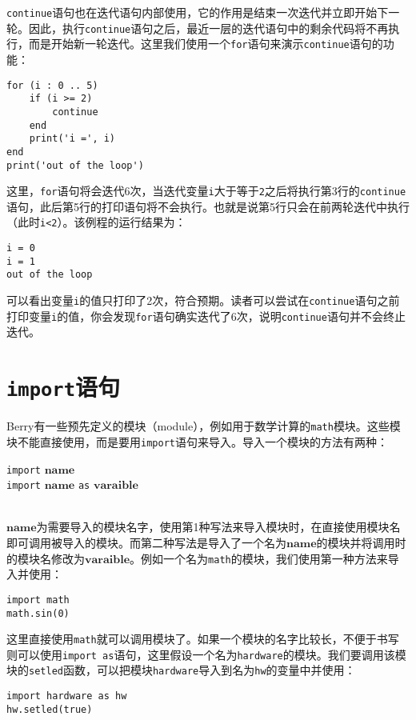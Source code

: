 \texttt{continue}语句也在迭代语句内部使用，它的作用是结束一次迭代并立即开始下一轮。因此，执行\texttt{continue}语句之后，最近一层的迭代语句中的剩余代码将不再执行，而是开始新一轮迭代。这里我们使用一个\texttt{for}语句来演示\texttt{continue}语句的功能：
\begin{lstlisting}[language=berry]
for (i : 0 .. 5)
    if (i >= 2)
        continue
    end
    print('i =', i)
end
print('out of the loop')
\end{lstlisting}
这里，\texttt{for}语句将会迭代6次，当迭代变量\texttt{i}大于等于\texttt{2}之后将执行第3行的\texttt{continue}语句，此后第5行的打印语句将不会执行。也就是说第5行只会在前两轮迭代中执行（此时\texttt{i<2}）。该例程的运行结果为：
\begin{lstlisting}[numbers=none]
i = 0
i = 1
out of the loop
\end{lstlisting}
可以看出变量\texttt{i}的值只打印了2次，符合预期。读者可以尝试在\texttt{continue}语句之前打印变量\texttt{i}的值，你会发现\texttt{for}语句确实迭代了6次，说明\texttt{continue}语句并不会终止迭代。

\section{\texttt{import}语句}

Berry有一些预先定义的模块（module），例如用于数学计算的\texttt{math}模块。这些模块不能直接使用，而是要用\texttt{import}语句来导入。导入一个模块的方法有两种：
\begin{algorithm}
    \texttt{import} $\bm{name}$ \\
    \texttt{import} $\bm{name}$ \texttt{as} $\bm{varaible}$
\end{algorithm}\vspace{-0.6em}\\
$\bm{name}$为需要导入的模块名字，使用第1种写法来导入模块时，在直接使用模块名即可调用被导入的模块。而第二种写法是导入了一个名为$\bm{name}$的模块并将调用时的模块名修改为$\bm{varaible}$。例如一个名为\texttt{math}的模块，我们使用第一种方法来导入并使用：
\begin{lstlisting}[language=berry, numbers=none]
import math
math.sin(0)
\end{lstlisting}
这里直接使用\texttt{math}就可以调用模块了。如果一个模块的名字比较长，不便于书写则可以使用\texttt{import as}语句，这里假设一个名为\texttt{hardware}的模块。我们要调用该模块的\texttt{setled}函数，可以把模块\texttt{hardware}导入到名为\texttt{hw}的变量中并使用：
\begin{lstlisting}[language=berry, numbers=none]
import hardware as hw
hw.setled(true)
\end{lstlisting}
